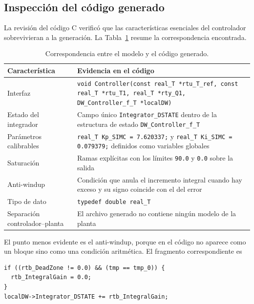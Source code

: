 \documentclass[conference,a4paper,10pt]{IEEEtran}
\begin{document}
\subsection{Inspección del código generado}

La revisión del código C verificó que las características esenciales del controlador sobrevivieran
a la generación. La Tabla~\ref{tab:codigo} resume la correspondencia encontrada.

\begin{table}[!t]
\caption{Correspondencia entre el modelo y el código generado.}
\label{tab:codigo}
\centering
\footnotesize
\begin{tabular}{@{}p{}p{}@{}}
\toprule
\textbf{Característica} & \textbf{Evidencia en el código} \\
\midrule
Interfaz &
\texttt{void Controller(const real\_T *rtu\_T\_ref, const real\_T *rtu\_T1, real\_T *rty\_Q1,
DW\_Controller\_f\_T *localDW)} \\
\addlinespace
Estado del integrador &
Campo único \texttt{Integrator\_DSTATE} dentro de la estructura de estado \texttt{DW\_Controller\_f\_T} \\
\addlinespace
Parámetros calibrables &
\texttt{real\_T Kp\_SIMC = 7.620337;} y \texttt{real\_T Ki\_SIMC = 0.079379;} definidos como
variables globales \\
\addlinespace
Saturación &
Ramas explícitas con los límites \texttt{90.0} y \texttt{0.0} sobre la salida \\
\addlinespace
Anti-windup &
Condición que anula el incremento integral cuando hay exceso y su signo coincide con el del error \\
\addlinespace
Tipo de dato &
\texttt{typedef double real\_T} \\
\addlinespace
Separación controlador--planta &
El archivo generado no contiene ningún modelo de la planta \\
\bottomrule
\end{tabular}
\end{table}

El punto menos evidente es el anti-windup, porque en el código no aparece como un bloque sino como
una condición aritmética. El fragmento correspondiente es

\begin{lstlisting}
if ((rtb_DeadZone != 0.0) && (tmp == tmp_0)) {
  rtb_IntegralGain = 0.0;
}
localDW->Integrator_DSTATE += rtb_IntegralGain;
\end{lstlisting}
\end{document}
